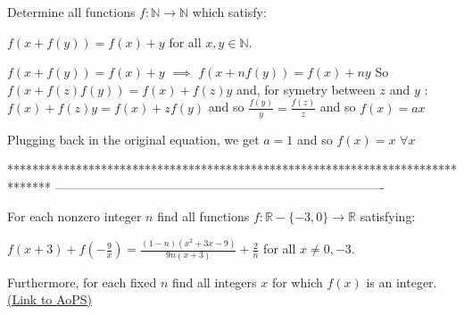 \begin{solution}
	\begin{tcolorbox}Determine all functions $ f: \mathbb{N} \rightarrow \mathbb{N}$ which satisfy:

$ f(x + f(y)) = f(x) + y$ for all $ x,y \in \mathbb{N}$.\end{tcolorbox}

$ f(x+f(y))=f(x)+y$ $ \implies$ $ f(x+nf(y))=f(x)+ny$
So $ f(x+f(z)f(y))=f(x)+f(z)y$ and, for symetry between $ z$ and $ y$ : $ f(x)+f(z)y=f(x)+zf(y)$ and so $ \frac{f(y)}{y}=\frac{f(z)}{z}$ and so $ f(x)=ax$

Plugging back in the original equation, we get $ a=1$ and so $ f(x)=x$ $ \forall x$
\end{solution}
*******************************************************************************
-------------------------------------------------------------------------------

\begin{problem}
	For each nonzero integer $ n$ find all functions $ f: \mathbb{R} - \{-3,0 \} \rightarrow \mathbb{R}$ satisfying:

$ f(x+3)+f \left( -\frac{9}{x} \right)=\frac{(1-n)(x^2+3x-9)}{9n(x+3)}+\frac{2}{n}$ for all $ x \not= 0,-3.$

Furthermore, for each fixed $ n$ find all integers $ x$ for which $ f(x)$ is an integer.
	\flushright \href{https://artofproblemsolving.com/community/c6h288025}{(Link to AoPS)}
\end{problem}



